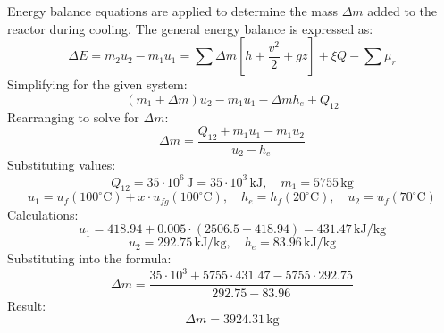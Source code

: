 Energy balance equations are applied to determine the mass \( \Delta m \) added to the reactor during cooling. The general energy balance is expressed as:  
\[
\Delta E = m_2 u_2 - m_1 u_1 = \sum \Delta m \left[ h + \frac{v^2}{2} + gz \right] + \xi Q - \sum \mu_r
\]  
Simplifying for the given system:  
\[
(m_1 + \Delta m) u_2 - m_1 u_1 - \Delta m h_e + Q_{12}
\]  
Rearranging to solve for \( \Delta m \):  
\[
\Delta m = \frac{Q_{12} + m_1 u_1 - m_1 u_2}{u_2 - h_e}
\]  
Substituting values:  
\[
Q_{12} = 35 \cdot 10^6 \, \text{J} = 35 \cdot 10^3 \, \text{kJ}, \quad m_1 = 5755 \, \text{kg}
\]  
\[
u_1 = u_f(100^\circ\text{C}) + x \cdot u_{fg}(100^\circ\text{C}), \quad h_e = h_f(20^\circ\text{C}), \quad u_2 = u_f(70^\circ\text{C})
\]  
Calculations:  
\[
u_1 = 418.94 + 0.005 \cdot (2506.5 - 418.94) = 431.47 \, \text{kJ/kg}
\]  
\[
u_2 = 292.75 \, \text{kJ/kg}, \quad h_e = 83.96 \, \text{kJ/kg}
\]  
Substituting into the formula:  
\[
\Delta m = \frac{35 \cdot 10^3 + 5755 \cdot 431.47 - 5755 \cdot 292.75}{292.75 - 83.96}
\]  
Result:  
\[
\Delta m = 3924.31 \, \text{kg}
\]